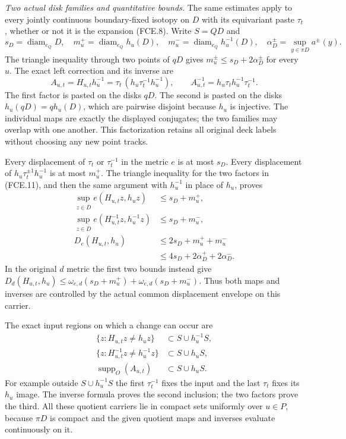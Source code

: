 \emph{Two actual disk families and quantitative bounds.}
The same estimates apply to every jointly continuous
boundary-fixed isotopy on $D$ with its equivariant paste
$\tau_t$, whether or not it is the expansion (FCE.8).
Write $S=QD$ and
\[
 s_D=\operatorname{diam}_{e_Q}D,\quad
 m_u^+=\operatorname{diam}_{e_Q}h_u(D),\quad
 m_u^-=\operatorname{diam}_{e_Q}h_u^{-1}(D),\quad
 \alpha_D^\pm=\sup_{y\in\pi D}a^\pm(y).
                                                               \tag{FCE.10}
\]
The triangle inequality through two points of $qD$ gives
$m_u^\pm\leq s_D+2\alpha_D^\pm$ for every $u$.
The exact left correction and its inverse are
\[
 A_{u,t}=H_{u,t}h_u^{-1}
       =\tau_t\,(h_u\tau_t^{-1}h_u^{-1}),\qquad
 A_{u,t}^{-1}=h_u\tau_t h_u^{-1}\tau_t^{-1}.
                                                               \tag{FCE.11}
\]
The first factor is pasted on the disks $qD$.
The second is pasted on the disks
$h_u(qD)=qh_u(D)$, which are pairwise disjoint because
$h_u$ is injective. The individual maps are exactly the
displayed conjugates; the two families may overlap with
one another. This factorization retains all original deck
labels without choosing any new point tracks.

Every displacement of $\tau_t$ or $\tau_t^{-1}$ in the
metric $e$ is at most $s_D$. Every displacement of
$h_u\tau_t^{\pm1}h_u^{-1}$ is at most $m_u^+$.
The triangle inequality for the two factors in (FCE.11),
and then the same argument with $h_u^{-1}$ in place of
$h_u$, proves
\[
 \begin{aligned}
 \sup_{z\in\overline D}e(H_{u,t}z,h_uz)&\leq s_D+m_u^+,\\
 \sup_{z\in\overline D}e(H_{u,t}^{-1}z,h_u^{-1}z)&\leq s_D+m_u^-,\\
 D_e(H_{u,t},h_u)&\leq2s_D+m_u^++m_u^-\\
                 &\leq4s_D+2\alpha_D^++2\alpha_D^-.
 \end{aligned}                                                 \tag{FCE.12}
\]
In the original $d$ metric the first two bounds instead give
$D_d(H_{u,t},h_u)\leq
\omega_{e,d}(s_D+m_u^+)+\omega_{e,d}(s_D+m_u^-)$.
Thus both maps and inverses are controlled by the actual
common displacement envelope on this carrier.

The exact input regions on which a change can occur are
\[
 \begin{aligned}
 \{z:H_{u,t}z\ne h_uz\}&\subset S\cup h_u^{-1}S,\\
 \{z:H_{u,t}^{-1}z\ne h_u^{-1}z\}&\subset S\cup h_uS,\\
 \operatorname{supp}_O(A_{u,t})&\subset S\cup h_uS.
 \end{aligned}                                                 \tag{FCE.13}
\]
For example outside $S\cup h_u^{-1}S$ the first
$\tau_t^{-1}$ fixes the input and the last $\tau_t$
fixes its $h_u$ image. The inverse formula proves the
second inclusion; the two factors prove the third.
All these quotient carriers lie in compact sets uniformly
over $u\in P$, because $\pi D$ is compact and the given
quotient maps and inverses evaluate continuously on it.

